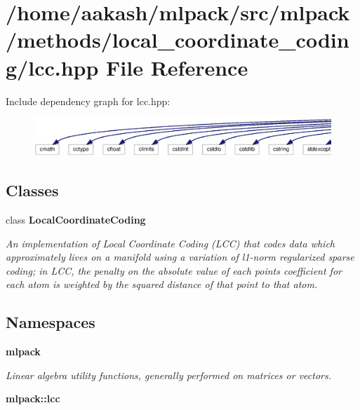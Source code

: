 \section{/home/aakash/mlpack/src/mlpack/methods/local\+\_\+coordinate\+\_\+coding/lcc.hpp File Reference}
\label{lcc_8hpp}
Include dependency graph for lcc.\+hpp\+:
\nopagebreak
\begin{figure}[H]
\begin{center}
\leavevmode
\includegraphics[width=350pt]{lcc_8hpp__incl}
\end{center}
\end{figure}
\subsection*{Classes}
\begin{DoxyCompactItemize}
\item 
class \textbf{ Local\+Coordinate\+Coding}
\begin{DoxyCompactList}\small\item\em An implementation of Local Coordinate Coding (L\+CC) that codes data which approximately lives on a manifold using a variation of l1-\/norm regularized sparse coding; in L\+CC, the penalty on the absolute value of each point\textquotesingle{}s coefficient for each atom is weighted by the squared distance of that point to that atom. \end{DoxyCompactList}\end{DoxyCompactItemize}
\subsection*{Namespaces}
\begin{DoxyCompactItemize}
\item 
 \textbf{ mlpack}
\begin{DoxyCompactList}\small\item\em Linear algebra utility functions, generally performed on matrices or vectors. \end{DoxyCompactList}\item 
 \textbf{ mlpack\+::lcc}
\end{DoxyCompactItemize}


